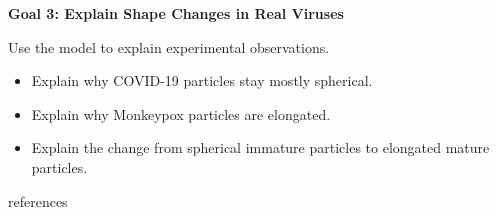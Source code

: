 \documentclass[12pt]{article}
\begin{document}
\begin{flushleft}
\textbf{Goal 3: Explain Shape Changes in Real Viruses}

Use the model to explain experimental observations.\\
\vspace{-1em}
\begin{itemize}
\setlength{\itemsep}{0pt}
\setlength{\parskip}{0pt}
\setlength{\parsep}{0pt}
\item Explain why COVID-19 particles stay mostly spherical.
\item Explain why Monkeypox particles are elongated.
\item Explain the change from spherical immature particles to elongated mature particles.
\end{itemize}


\newpage

\end{flushleft}

 {references}  
\end{document}
